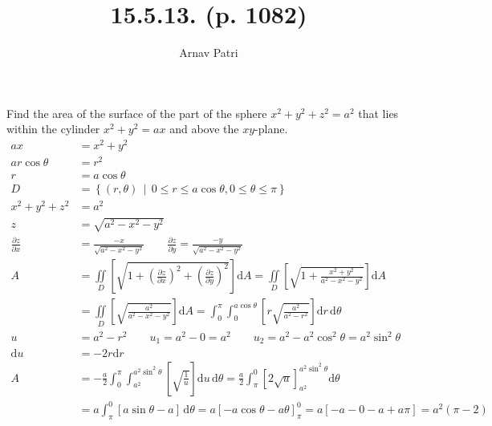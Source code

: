 \documentclass[A4, 12pt]{article}
\title{15.5.13. (p. 1082)}
\author{Arnav Patri}
\renewcommand{\d}{\mathrm{d}}
\newcommand{\pder}[2]{\frac{\partial #1}{\partial #2}}
\begin{document}
	\maketitle	
	\thispagestyle{empty}
	\flushleft
	Find the area of the surface of the part of the sphere $x^2 + y^2 + z^2 = a^2$ that lies within the cylinder $x^2 + y^2 = ax$ and above the $xy$-plane.
	\begin{align*}
		ax &= x^2 + y^2 \\
		ar\cos\theta &= r^2 \\
		r &= a\cos\theta \\
		D &= \left\{(r, \theta) \,\middle|\, 0 \le r \le a\cos\theta, 0 \le \theta \le \pi\right\} \\
		x^2 + y^2 + z^2 &= a^2 \\
		z &= \sqrt{a^2 - x^2 - y^2} \\
		\pder{z}{x} &= \frac{-x}{\sqrt{a^2 - x^2 - y^2}} \qquad
				\pder{z}{y} = \frac{-y}{\sqrt{a^2 - x^2 - y^2}} \\
		A &= \iint\limits_D \left[\sqrt{1 + \left(\pder{z}{x}\right)^2 + \left(\pder{z}{y}\right)^2}\right]\d A 
				= \iint\limits_D\left[\sqrt{1 + \frac{x^2 + y^2}{a^2 - x^2 - y^2}}\right]\d A \\
			&= \iint\limits_D\left[\sqrt{\frac{a^2}{a^2 - x^2 - y^2}}\right]\d A 
				= \int_0^\pi\int_0^{a\cos\theta}\left[r\sqrt{\frac{a^2}{a^2 - r^2}}\right]\d r\,\d\theta \\
		u &= a^2 -r^2 \qquad u_1 = a^2 - 0 = a^2 \qquad u_2 = a^2 -a^2\cos^2\theta = a^2\sin^2\theta \\
		\d u &= -2r\d r\\
		A &= -\frac{a}{2}\int_0^\pi\int_{a^2}^{a^2\sin^2\theta}\left[\sqrt{\frac{1}{u}}\right]\d u\,\d\theta 
				= \frac{a}{2}\int_\pi^0\left[2\sqrt{u}\right]_{a^2}^{a^2\sin^2\theta}\d\theta \\
			&= a\int_\pi^0[a\sin\theta - a]\,\d\theta
				= a[-a\cos\theta - a\theta]_\pi^0
				= a[-a - 0 - a + a\pi]
				= a^2(\pi - 2) \\
	\end{align*}
\end{document}
